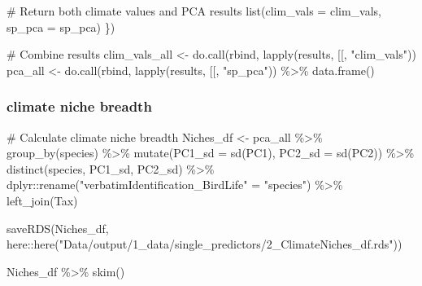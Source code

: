 \documentclass[
  letterpaper,
  DIV=11,
  numbers=noendperiod]{scrreprt}
\newenvironment{Shaded}{\begin{snugshade}}{\end{snugshade}}
\newcommand{\AttributeTok}[1]{\textcolor[rgb]{0.40,0.45,0.13}{#1}}
\newcommand{\CommentTok}[1]{\textcolor[rgb]{0.37,0.37,0.37}{#1}}
\newcommand{\FunctionTok}[1]{\textcolor[rgb]{0.28,0.35,0.67}{#1}}
\newcommand{\NormalTok}[1]{\textcolor[rgb]{0.00,0.23,0.31}{#1}}
\newcommand{\OtherTok}[1]{\textcolor[rgb]{0.00,0.23,0.31}{#1}}
\newcommand{\SpecialCharTok}[1]{\textcolor[rgb]{0.37,0.37,0.37}{#1}}
\newcommand{\StringTok}[1]{\textcolor[rgb]{0.13,0.47,0.30}{#1}}
\begin{document}
\begin{Shaded}
\begin{Highlighting}[]
  \CommentTok{\# Return both climate values and PCA results}
  \FunctionTok{list}\NormalTok{(}\AttributeTok{clim\_vals =}\NormalTok{ clim\_vals, }\AttributeTok{sp\_pca =}\NormalTok{ sp\_pca)}
\NormalTok{\})}

\CommentTok{\# Combine results}
\NormalTok{clim\_vals\_all }\OtherTok{\textless{}{-}} \FunctionTok{do.call}\NormalTok{(rbind, }\FunctionTok{lapply}\NormalTok{(results, }\StringTok{\textasciigrave{}}\AttributeTok{[[}\StringTok{\textasciigrave{}}\NormalTok{, }\StringTok{"clim\_vals"}\NormalTok{))}
\NormalTok{pca\_all }\OtherTok{\textless{}{-}} \FunctionTok{do.call}\NormalTok{(rbind, }\FunctionTok{lapply}\NormalTok{(results, }\StringTok{\textasciigrave{}}\AttributeTok{[[}\StringTok{\textasciigrave{}}\NormalTok{, }\StringTok{"sp\_pca"}\NormalTok{)) }\SpecialCharTok{\%\textgreater{}\%}
  \FunctionTok{data.frame}\NormalTok{()}
\end{Highlighting}
\end{Shaded}

\hypertarget{climate-niche-breadth}{%
\subsubsection{climate niche breadth}\label{climate-niche-breadth}}

\begin{Shaded}
\begin{Highlighting}[]
\CommentTok{\# Calculate climate niche breadth}
\NormalTok{Niches\_df }\OtherTok{\textless{}{-}}\NormalTok{ pca\_all }\SpecialCharTok{\%\textgreater{}\%}
  \FunctionTok{group\_by}\NormalTok{(species) }\SpecialCharTok{\%\textgreater{}\%}
  \FunctionTok{mutate}\NormalTok{(}\AttributeTok{PC1\_sd =} \FunctionTok{sd}\NormalTok{(PC1),}
         \AttributeTok{PC2\_sd =} \FunctionTok{sd}\NormalTok{(PC2)) }\SpecialCharTok{\%\textgreater{}\%}
  \FunctionTok{distinct}\NormalTok{(species, PC1\_sd, PC2\_sd) }\SpecialCharTok{\%\textgreater{}\%}
\NormalTok{  dplyr}\SpecialCharTok{::}\FunctionTok{rename}\NormalTok{(}\StringTok{"verbatimIdentification\_BirdLife"} \OtherTok{=} \StringTok{"species"}\NormalTok{) }\SpecialCharTok{\%\textgreater{}\%}
  \FunctionTok{left\_join}\NormalTok{(Tax)}

\FunctionTok{saveRDS}\NormalTok{(Niches\_df, here}\SpecialCharTok{::}\FunctionTok{here}\NormalTok{(}\StringTok{"Data/output/1\_data/single\_predictors/2\_ClimateNiches\_df.rds"}\NormalTok{))}

\NormalTok{Niches\_df }\SpecialCharTok{\%\textgreater{}\%}
  \FunctionTok{skim}\NormalTok{()}
\end{Highlighting}
\end{Shaded}
\end{document}
